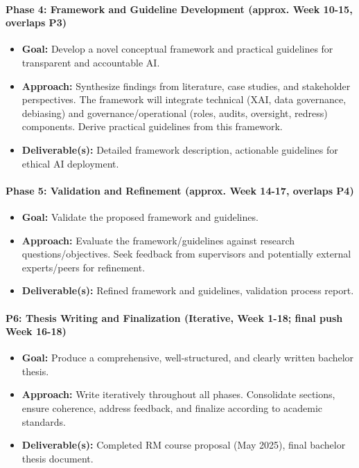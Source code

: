 \documentclass[english]{hogent-article}
\begin{document}
\paragraph{Phase 4: Framework and Guideline Development (approx. Week 10-15, overlaps P3)}
\begin{itemize}
    \item \textbf{Goal:} Develop a novel conceptual framework and practical guidelines for transparent and accountable AI.
    \item \textbf{Approach:} Synthesize findings from literature, case studies, and stakeholder perspectives. The framework will integrate technical (XAI, data governance, debiasing) and governance/operational (roles, audits, oversight, redress) components. Derive practical guidelines from this framework.
    \item \textbf{Deliverable(s):} Detailed framework description, actionable guidelines for ethical AI deployment.
\end{itemize}

\paragraph{Phase 5: Validation and Refinement (approx. Week 14-17, overlaps P4)}
\begin{itemize}
    \item \textbf{Goal:} Validate the proposed framework and guidelines.
    \item \textbf{Approach:} Evaluate the framework/guidelines against research questions/objectives. Seek feedback from supervisors and potentially external experts/peers for refinement.
    \item \textbf{Deliverable(s):} Refined framework and guidelines, validation process report.
\end{itemize}

\paragraph{P6: Thesis Writing and Finalization (Iterative, Week 1-18; final push Week 16-18)}
\begin{itemize}
    \item \textbf{Goal:} Produce a comprehensive, well-structured, and clearly written bachelor thesis.
    \item \textbf{Approach:} Write iteratively throughout all phases. Consolidate sections, ensure coherence, address feedback, and finalize according to academic standards.
    \item \textbf{Deliverable(s):} Completed RM course proposal (May 2025), final bachelor thesis document.
\end{itemize}
\end{document}
